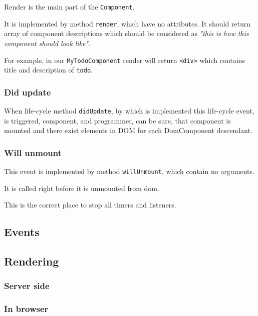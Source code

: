       Render is the main part of the \texttt{Component}. 

      It is implemented by method \texttt{render}, which have no attributes.
      It should return array of component descriptions which should be considered as 
      \textit{"this is how this component should look like"}.

      For example, in our \texttt{MyTodoComponent} render will return \texttt{<div>} which contains title and description of \texttt{todo}.
      

    \subsubsection{Did update}\label{subsec:our-architecture-lifecycle-didupdate}

      When life-cycle method \texttt{didUpdate}, 
      by which is implemented this life-cycle event, 
      is triggered, component, and programmer, can be sure, 
      that component is mounted and there exist elements in DOM for each DomComponent descendant.

    \subsubsection{Will unmount}\label{subsec:our-architecture-lifecycle-willunmount}

      This event is implemented by method \texttt{willUnmount}, which contain no arguments.
      
      It is called right before it is unmounted from dom. 

      This is the correct place to stop all timers and listeners.
      

  \subsection{Events}\label{subsec:our-architecture-events}
  \subsection{Rendering}\label{subsec:our-architecture-rendering}
  \subsubsection{Server side}\label{subsec:our-architecture-rendering-server}
  \subsubsection{In browser}\label{subsec:our-architecture-rendering-browser}
